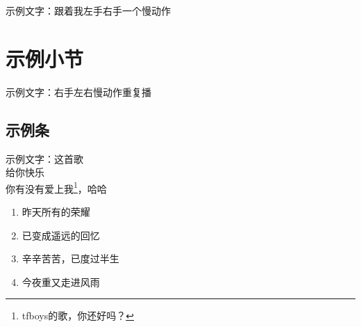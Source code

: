 示例文字：跟着我左手右手一个慢动作
\section{示例小节}
示例文字：右手左右慢动作重复播
\subsection{示例条}
示例文字：这首歌\\ 给你快乐\\ 你有没有爱上我\footnote{tfboys的歌，你还好吗？}，哈哈

\begin{enumerate}[leftmargin=24pt]
	\item 昨天所有的荣耀
	\item 已变成遥远的回忆
	\item 辛辛苦苦，已度过半生
	\item 今夜重又走进风雨
\end{enumerate}

